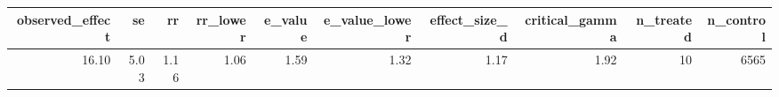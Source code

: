 \begin{tabular}{rrrrrrrrrr}
\toprule
observed\_effect & se & rr & rr\_lower & e\_value & e\_value\_lower & effect\_size\_d & critical\_gamma & n\_treated & n\_control \\
\midrule
16.10 & 5.03 & 1.16 & 1.06 & 1.59 & 1.32 & 1.17 & 1.92 & 10 & 6565 \\
\bottomrule
\end{tabular}
